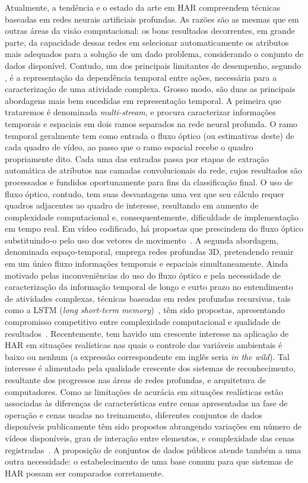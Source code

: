 Atualmente, a tendência e o estado da arte em HAR compreendem técnicas baseadas em redes neurais artificiais profundas. As razões são as mesmas que em outras áreas da visão computacional: os bons resultados decorrentes, em grande parte, da capacidade dessas redes em selecionar automaticamente os atributos mais adequados para a solução de um dado problema, considerando o conjunto de dados disponível. Contudo, um dos principais limitantes de desempenho, segundo \textcite{yao-2019}, é a representação da dependência temporal entre ações, necessária para a caracterização de uma atividade complexa. 
Grosso modo, são duas as principais abordagens mais bem sucedidas em representação temporal. A primeira que trataremos é denominada \emph{multi-stream}, e procura caracterizar informações temporais e espaciais em dois ramos separados na rede neural profunda. O ramo temporal geralmente tem como entrada o fluxo óptico (ou estimativas deste) de cada quadro de vídeo, ao passo que o ramo espacial recebe o quadro propriamente dito. Cada uma das entradas passa por etapas de extração automática de atributos nas camadas convolucionais da rede, cujos resultados são processados e fundidos oportunamente para fins da classificação final. O uso de fluxo óptico, contudo, tem suas desvantagens uma vez que seu cálculo requer quadros adjacentes ao quadro de interesse, resultando em aumento de complexidade computacional e, consequentemente, dificuldade de implementação em tempo real. Em vídeo codificado, há propostas que prescindem do fluxo óptico substituindo-o pelo uso dos vetores de movimento~\parencite{yao-2019}. A segunda abordagem, denominada espaço-temporal, emprega redes profundas 3D, pretendendo reunir em um único fluxo informações temporais e espaciais simultaneamente. Ainda motivado pelas inconveniências do uso do fluxo óptico e pela necessidade de caracterização da informação temporal de longo e curto prazo no entendimento de atividades complexas, técnicas baseadas em redes profundas recursivas, tais como a LSTM (\emph{long short-term memory})~\parencite{hochreiter-1997}, têm sido propostas, apresentando compromisso competitivo entre complexidade computacional e qualidade de resultados~\parencite{donahue-2016, herath-2017, xia-2020}.
Recentemente, tem havido um crescente interesse na aplicação de HAR em situações realísticas nas quais o controle das variáveis ambientais é baixo ou nenhum (a expressão correspondente em inglês seria \emph{in the wild}). Tal interesse é alimentado pela qualidade crescente dos sistemas de reconhecimento, resultante dos progressos nas áreas de redes profundas, e arquitetura de computadores. Como as limitações de acurácia em situações realísticas estão associadas às diferenças de características entre cenas apresentadas na fase de operação e cenas usadas no treinamento, diferentes conjuntos de dados disponíveis publicamente têm sido propostos abrangendo variações em número de vídeos disponíveis, grau de interação entre elementos, e complexidade das cenas registradas~\parencite{jegham-2020, kongr-2018}. A proposição de conjuntos de dados públicos atende também a uma outra necessidade: o estabelecimento de uma base comum para que sistemas de HAR possam ser comparados corretamente.
